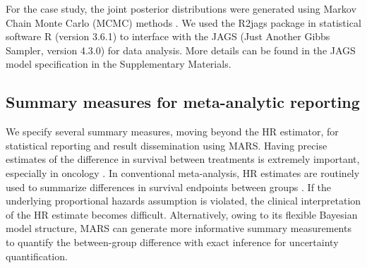 \documentclass[12pt]{article}
\theoremstyle{mystyle}
\begin{document}
For the case study, the joint posterior distributions were generated using Markov Chain Monte Carlo (MCMC) methods \citep{Gelman2003}. We used the R2jags package in statistical software R (version 3.6.1) to interface with the JAGS (Just Another Gibbs Sampler, version 4.3.0) for data analysis. More details can be found in the JAGS model specification in the Supplementary Materials.


\subsection{Summary measures for meta-analytic reporting}
\label{sec:3:5} 

 



We specify several summary measures, moving beyond the HR estimator, for statistical reporting and result dissemination using MARS. Having precise estimates of the difference in survival between treatments is extremely important, especially in oncology \citep{Michiels2005}. In conventional meta-analysis, HR estimates are routinely used to summarize differences in survival endpoints between groups \citep{Moher2010,Higgins2020}. 
If the underlying proportional hazards assumption is violated, the clinical interpretation of the HR estimate becomes difficult. Alternatively, owing to its flexible Bayesian model structure, MARS can generate more informative summary measurements to quantify the between-group difference with exact inference for uncertainty quantification.
\end{document}
